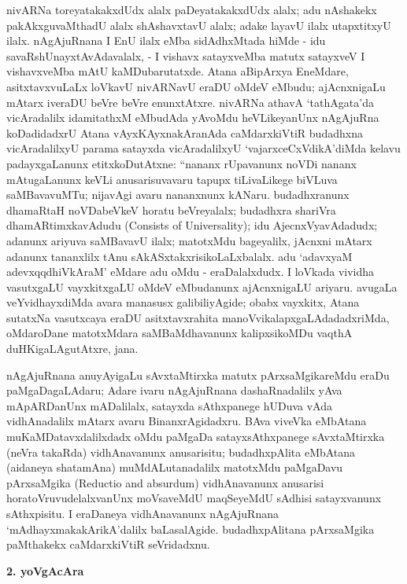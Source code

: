 nivARNa toreyatakakxdUdx alalx paDeyatakakxdUdx alalx; adu nAshakekx pakAkxgu\-vaMthadU alalx shAshavxtavU alalx; adake layavU ilalx utapxtitxyU ilalx. nAgAjuRnana I EnU ilalx eMba sidAdhxMtada hiMde - idu savaRshUnayxtAvAdavalalx, - I vishavx satayxveMba matutx satayxveV I vishavxveMba mAtU kaMDubarutatxde. Atana aBipArxya EneMdare, asitxtavxvuLaLx loVkavU nivARNavU eraDU oMdeV eMbudu; ajAcnxnigaLu mAtarx iveraDU beVre beVre enunxtAtxre. nivARNa athavA `tathAgata'da vicAradalilx idamitathxM eMbudAda yAvoMdu heVLikeyanUnx nAgAjuRna koDadidadxrU Atana vAyxKAyxnakAranAda caMdarxkiVtiR budadhxna vicAradalilxyU parama satayxda vicAradalilxyU `vajarxceCxVdikA'diMda kelavu padayxgaLanunx etitxkoDutAtxne: ``nananx rUpavanunx noVDi nananx mAtugaLanunx keVLi anusarisuvavaru tapupx tiLivaLikege biVLuva saMBavavuMTu; nijavAgi avaru nananxnunx kANaru. budadhxranunx dhamaRtaH noVDabeVkeV horatu beVreyalalx; budadhxra shariVra dhamARtimxkavAdudu {\rm (Consists of Universality)}; idu AjecnxVyavAdadudx; adanunx ariyuva saMBavavU ilalx; matotxMdu bageyalilx, jAcnxni mAtarx adanunx tananxlilx tAnu sAkASxtakxrisikoLaLxbalalx. adu `adavxyaM adevxqqdhiVkAraM' eMdare adu oMdu - eraDalalxdudx. I loVkada vividha vasutxgaLU vayxkitxgaLU oMdeV eMbudanunx ajAcnxnigaLU ariyaru. avugaLa veYvidhayxdiMda avara manasusx galibiliyAgide; obabx vayxkitx, Atana sutatxNa vasutxcaya eraDU asitxtavxrahita manoVvikalapxgaLAdadadxriMda, oMdaroDane matotxMdara saMBaMdhavanunx kalipxsikoMDu vaqthA duHKigaLAgutAtxre, jana.

\newpage

nAgAjuRnana anuyAyigaLu sAvxtaMtirxka matutx pArxsaMgikareMdu eraDu paMgaDagaLAdaru; Adare ivaru nAgAjuRnana dashaRnadalilx yAva mApARDanUnx mADalilalx, satayxda sAthxpanege hUDuva vAda vidhAnadalilx mAtarx avaru BinanxrAgidadxru. BAva viveVka eMbAtana muKaMDatavxdalilxdadx oMdu paMgaDa satayxsAthxpanege sAvxtaMtirxka (neVra takaRda) vidhAnavanunx anusarisitu; budadhxpAlita eMbAtana (aidaneya shatamAna) muMdALutanadalilx matotxMdu paMgaDavu pArxsaMgika {\rm (Reductio and absurdum)} vidhAnavanunx anusarisi horatoVruvudelalxvanUnx moVsaveMdU maqSeyeMdU sAdhisi satayxvanunx sAthxpisitu. I eraDaneya vidhAnavanunx nAgAjuRnana `mAdhayxmakakArikA'dalilx baLasalAgide. budadhxpAlitana pArxsaMgika paMthakekx caMdarxkiVtiR seVridadxnu.

\begin{center}
{\textbf{\Large 2. yoVgAcAra}}
\end{center}

